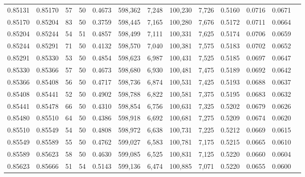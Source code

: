 \begin{tabular}{rrrrrrrrrrrrr}
0.85131 & 0.85170 &    57 &  50 &                                     0.4673 & 598,362 &   7,248 & 100,230 &   7,726 & 0.5160 & 0.0716 & 0.0671 \\
0.85170 & 0.85204 &    83 &  50 &                                     0.3759 & 598,445 &   7,165 & 100,280 &   7,676 & 0.5172 & 0.0711 & 0.0664 \\
0.85204 & 0.85244 &    54 &  51 &                                     0.4857 & 598,499 &   7,111 & 100,331 &   7,625 & 0.5174 & 0.0706 & 0.0659 \\
0.85244 & 0.85291 &    71 &  50 &                                     0.4132 & 598,570 &   7,040 & 100,381 &   7,575 & 0.5183 & 0.0702 & 0.0652 \\
0.85291 & 0.85330 &    53 &  50 &                                     0.4854 & 598,623 &   6,987 & 100,431 &   7,525 & 0.5185 & 0.0697 & 0.0647 \\
0.85330 & 0.85366 &    57 &  50 &                                     0.4673 & 598,680 &   6,930 & 100,481 &   7,475 & 0.5189 & 0.0692 & 0.0642 \\
0.85366 & 0.85408 &    56 &  50 &                                     0.4717 & 598,736 &   6,874 & 100,531 &   7,425 & 0.5193 & 0.0688 & 0.0637 \\
0.85408 & 0.85441 &    52 &  50 &                                     0.4902 & 598,788 &   6,822 & 100,581 &   7,375 & 0.5195 & 0.0683 & 0.0632 \\
0.85441 & 0.85478 &    66 &  50 &                                     0.4310 & 598,854 &   6,756 & 100,631 &   7,325 & 0.5202 & 0.0679 & 0.0626 \\
0.85480 & 0.85510 &    64 &  50 &                                     0.4386 & 598,918 &   6,692 & 100,681 &   7,275 & 0.5209 & 0.0674 & 0.0620 \\
0.85510 & 0.85549 &    54 &  50 &                                     0.4808 & 598,972 &   6,638 & 100,731 &   7,225 & 0.5212 & 0.0669 & 0.0615 \\
0.85549 & 0.85589 &    55 &  50 &                                     0.4762 & 599,027 &   6,583 & 100,781 &   7,175 & 0.5215 & 0.0665 & 0.0610 \\
0.85589 & 0.85623 &    58 &  50 &                                     0.4630 & 599,085 &   6,525 & 100,831 &   7,125 & 0.5220 & 0.0660 & 0.0604 \\
0.85623 & 0.85666 &    51 &  54 &                                     0.5143 & 599,136 &   6,474 & 100,885 &   7,071 & 0.5220 & 0.0655 & 0.0600 \\

\end{tabular}
